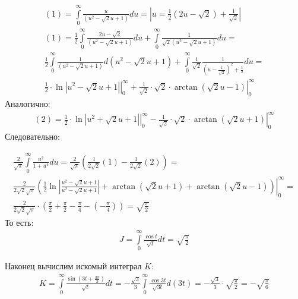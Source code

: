 \documentclass[12pt, a4paper]{article}
\begin{document}
\begin{equation*}
\begin{aligned}
(1) = \int\limits_0^{\infty} \frac{u}{(u^2-\sqrt{2}u+1)} du = |u = \frac{1}{2}(2u-\sqrt{2})+\frac{1}{\sqrt{2}}| \\
(1) = \frac{1}{2} \int\limits_0^{\infty} \frac{2u-\sqrt{2}}{(u^2-\sqrt{2}u+1)} du + \int\limits_0^{\infty} \frac{1}{\sqrt{2}(u^2-\sqrt{2}u+1)} du =\\
\frac{1}{2} \int\limits_0^{\infty} \frac{1}{(u^2-\sqrt{2}u+1)} d(u^2 -\sqrt{2}u+1) + \int\limits_0^{\infty} \frac{1}{\sqrt{2}}\frac{1}{(u-\frac{1}{\sqrt{2}})^2+\frac{1}{2}} du = \\
\left. \frac{1}{2}\cdot \ln{\left|u^2-\sqrt{2}u+1\right|} \right|_0^{\infty} + \left. \frac{1}{\sqrt{2}}\cdot \sqrt{2}\cdot \arctan(\sqrt{2}u-1) \right|_0^{\infty}
\end{aligned}
\end{equation*}
Аналогично:
\begin{equation*}
\begin{aligned}
(2) = \left. \frac{1}{2}\cdot \ln{\left|u^2+\sqrt{2}u+1\right|} \right|_0^{\infty} - \left. \frac{1}{\sqrt{2}}\cdot \sqrt{2}\cdot \arctan(\sqrt{2}u+1) \right|_0^{\infty}
\end{aligned}
\end{equation*}
Следовательно:

\begin{equation*}
\begin{aligned}
\frac{2}{\sqrt{\pi}} \int\limits_0^{\infty} \frac{u^2}{1+u^4} du = \frac{2}{\sqrt{\pi}} \left( \frac{1}{2\sqrt{2}} (1) - \frac{1}{2\sqrt{2}} (2) \right) = \\
\left. \frac{2}{2\sqrt{2}\sqrt{\pi}} \left( \frac{1}{2}  \ln{\left|\frac{u^2-\sqrt{2}u+1}{u^2-\sqrt{2}u+1}\right|} +   \arctan(\sqrt{2}u+1) +  \arctan(\sqrt{2}u-1)  \right) \right|_0^{\infty} = \\
\frac{2}{2\sqrt{2} \sqrt{\pi}}\cdot \left(\frac{\pi}{2} + \frac{\pi}{2} - \frac{\pi}{4} - \left(-\frac{\pi}{4}\right) \right) = \sqrt{\frac{\pi}{2}}
\end{aligned}
\end{equation*}
То есть:
\begin{equation*}
\begin{aligned}
J = \int\limits_0^{\infty} \frac{\cos{t}}{\sqrt{t}} dt = \sqrt{\frac{\pi}{2}}
\end{aligned}
\end{equation*}

Наконец вычислим искомый интеграл $K$:
\begin{equation*}
\begin{aligned}
K = \int\limits_0^{\infty} \frac{\sin(3t + \frac{3\pi}{2})}{\sqrt{t}} dt = -\frac{\sqrt{3}}{3}\int\limits_0^{\infty} \frac{\cos{3t}}{\sqrt{3t}} d (3t) = -\frac{\sqrt{3}}{3}\cdot \sqrt{\frac{\pi}{2}} = -\sqrt{\frac{\pi}{6}}
\end{aligned}
\end{equation*}
\end{document}
